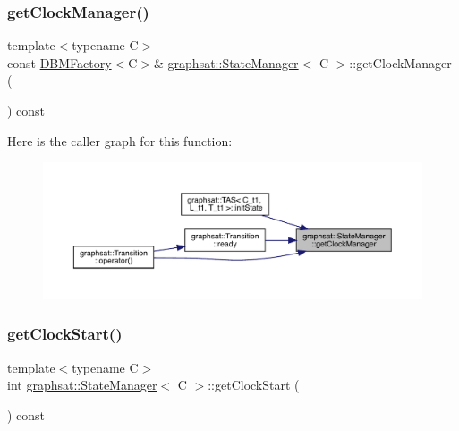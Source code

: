 \subsubsection{\texorpdfstring{getClockManager()}{getClockManager()}}
{\footnotesize\ttfamily template$<$typename C$>$ \\
const \mbox{\hyperlink{classgraphsat_1_1_d_b_m_factory}{D\+B\+M\+Factory}}$<$C$>$\& \mbox{\hyperlink{classgraphsat_1_1_state_manager}{graphsat\+::\+State\+Manager}}$<$ C $>$\+::get\+Clock\+Manager (\begin{DoxyParamCaption}{ }\end{DoxyParamCaption}) const\hspace{0.3cm}{\ttfamily [inline]}}

Here is the caller graph for this function\+:
\nopagebreak
\begin{figure}[H]
\begin{center}
\leavevmode
\includegraphics[width=350pt]{classgraphsat_1_1_state_manager_af485c1cf6dc6cd88d4d535e499b5daa5_icgraph}
\end{center}
\end{figure}
\mbox{\label{classgraphsat_1_1_state_manager_a0779ee513588143a679a9e182caaa9b3}} 
\subsubsection{\texorpdfstring{getClockStart()}{getClockStart()}}
{\footnotesize\ttfamily template$<$typename C$>$ \\
int \mbox{\hyperlink{classgraphsat_1_1_state_manager}{graphsat\+::\+State\+Manager}}$<$ C $>$\+::get\+Clock\+Start (\begin{DoxyParamCaption}{ }\end{DoxyParamCaption}) const\hspace{0.3cm}{\ttfamily [inline]}}

